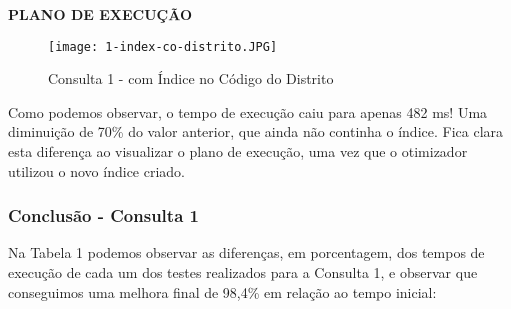 \documentclass[12pt,a4paper]{article}
\begin{document}
\begin{flushleft}
\textbf{PLANO DE EXECUÇÃO}\\
\end{flushleft}

\begin{figure}[H]
    \centering
    \texttt{[image: 1-index-co-distrito.JPG]}
    \caption{Consulta 1 - com Índice no Código do Distrito}
    \label{fig:diagrama}
\end{figure}

Como podemos observar, o tempo de execução caiu para apenas 482 ms! Uma diminuição de 70\% do valor anterior, que ainda não continha o índice. Fica clara esta diferença ao visualizar o plano de execução, uma vez que o otimizador utilizou o novo índice criado.


\subsubsection{Conclusão - Consulta 1}
\vspace{0.5cm}
Na Tabela 1 podemos observar as diferenças, em porcentagem, dos tempos de execução de cada um dos testes realizados para a Consulta 1, e observar que conseguimos uma melhora final de 98,4\% em relação ao tempo inicial:

\begin{table}[htbp]
  \centering
  \caption{Comparação Consulta 1}
  \label{tab:compconsulta1}%
\end{table}%
\end{document}
